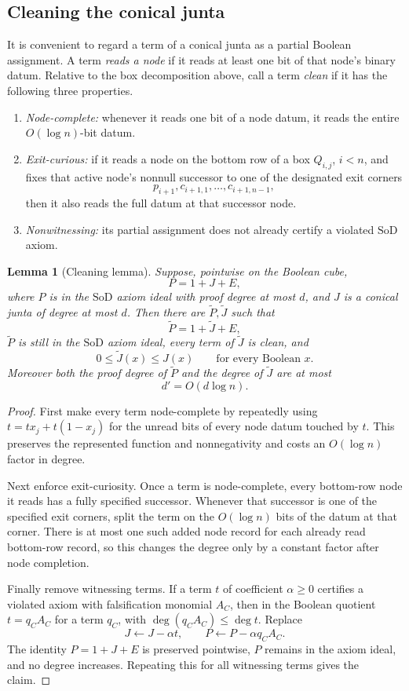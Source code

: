 \documentclass[11pt]{article}
\newtheorem{lemma}[theorem]{Lemma}
\theoremstyle{definition}
\newcommand{\SoD}{\mathrm{SoD}}
\begin{document}
\subsection{Cleaning the conical junta}

It is convenient to regard a term of a conical junta as a partial Boolean assignment.
A term \emph{reads a node} if it reads at least one bit of that node's binary datum.
Relative to the box decomposition above, call a term \emph{clean} if it has the
following three properties.
\begin{enumerate}[label=(\roman*)]
\item \emph{Node-complete:} whenever it reads one bit of a node datum, it reads the
entire $O(\log n)$-bit datum.
\item \emph{Exit-curious:} if it reads a node on the bottom row of a box $Q_{i,j}$,
$i<n$, and fixes that active node's nonnull successor to one of the designated exit
corners
\[
  p_{i+1},c_{i+1,1},\ldots,c_{i+1,n-1},
\]
then it also reads the full datum at that successor node.
\item \emph{Nonwitnessing:} its partial assignment does not already certify a
violated $\SoD$ axiom.
\end{enumerate}

\begin{lemma}[Cleaning lemma]\label{lem:cleaning}
Suppose, pointwise on the Boolean cube,
\[
  P=1+J+E,
\]
where $P$ is in the $\SoD$ axiom ideal with proof degree at most $d$, and $J$ is a
conical junta of degree at most $d$.  Then there are $\widetilde P,\widetilde J$ such
that
\[
  \widetilde P=1+\widetilde J+E,
\]
$\widetilde P$ is still in the $\SoD$ axiom ideal, every term of $\widetilde J$ is
clean, and
\[
  0\le \widetilde J(x)\le J(x)
  \qquad\text{for every Boolean }x.
\]
Moreover both the proof degree of $\widetilde P$ and the degree of
$\widetilde J$ are at most
\[
  d'=O(d\log n).
\]
\end{lemma}

\begin{proof}
First make every term node-complete by repeatedly using
$t=tx_j+t(1-x_j)$ for the unread bits of every node datum touched by $t$.  This
preserves the represented function and nonnegativity and costs an $O(\log n)$ factor
in degree.

Next enforce exit-curiosity.  Once a term is node-complete, every bottom-row node it
reads has a fully specified successor.  Whenever that successor is one of the
specified exit corners, split the term on the $O(\log n)$ bits of the datum at that
corner.  There is at most one such added node record for each already read bottom-row
record, so this changes the degree only by a constant factor after node completion.

Finally remove witnessing terms.  If a term $t$ of coefficient $\alpha\ge0$ certifies
a violated axiom with falsification monomial $A_C$, then in the Boolean quotient
$t=q_CA_C$ for a term $q_C$, with
$\deg(q_CA_C)\le\deg t$.  Replace
\[
  J\leftarrow J-\alpha t,
  \qquad
  P\leftarrow P-\alpha q_CA_C.
\]
The identity $P=1+J+E$ is preserved pointwise, $P$ remains in the axiom ideal, and no
degree increases.  Repeating this for all witnessing terms gives the claim.
\end{proof}
\end{document}
